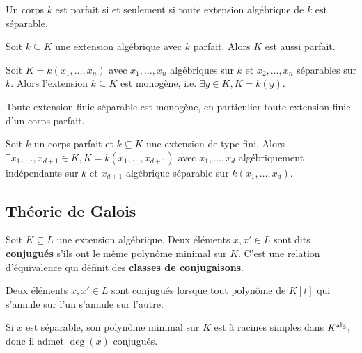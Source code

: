 	\begin{pop}
		Un corps $k$ est parfait si et seulement si toute extension algébrique de $k$ est séparable.
	\end{pop}
	
	\begin{pop}
		Soit $k \subseteq K$ une extension algébrique avec $k$ parfait.
		Alors $K$ est aussi parfait.
	\end{pop}
	
	\begin{thm}
		Soit $K = k(x_1,\ldots,x_n)$ avec $x_1,\ldots,x_n$ algébriques sur $k$ et $x_2,\ldots,x_n$ séparables sur $k$.
		Alors l'extension $k \subseteq K$ est monogène, i.e. $\exists y \in K, K = k(y)$.
	\end{thm}
	
	\begin{cor}
		Toute extension finie séparable est monogène, en particulier toute extension finie d'un corps parfait.
	\end{cor}
	
	\begin{pop}
		Soit $k$ un corps parfait et $k \subseteq K$ une extension de type fini.
		Alors $\exists x_1,\ldots,x_{d + 1} \in K, K = k(x_1,\ldots,x_{d + 1})$ avec $x_1,\ldots,x_d$ algébriquement indépendants sur $k$ et $x_{d + 1}$ algébrique séparable sur $k(x_1,\ldots,x_d)$.
	\end{pop}



\subsection{Théorie de Galois}

	\begin{defn}
		Soit $K \subseteq L$ une extension algébrique.
		Deux éléments $x,x' \in L$ sont dits \textbf{conjugués} s'ils ont le même polynôme minimal sur $K$.
		C'est une relation d'équivalence qui définit des \textbf{classes de conjugaisons}.
	\end{defn}
	
	\begin{pop}
		Deux éléments $x,x' \in L$ sont conjugués lorsque tout polynôme de $K[t]$ qui s'annule sur l'un s'annule sur l'autre.
	\end{pop}
	
	\begin{rem}
		Si $x$ est séparable, son polynôme minimal sur $K$ est à racines simples dans $K^{\operatorname{alg}}$, donc il admet $\deg(x)$ conjugués.
	\end{rem}
	
